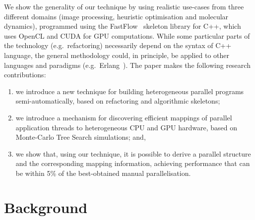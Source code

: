\documentclass[smallextended]{svjour3}
\begin{document}
We show the generality of our technique by using realistic 
use-cases from three different domains (image processing, 
heuristic optimisation and molecular dynamics), %
programmed using the FastFlow~\cite{AldinucciDKMT11} skeleton library for C++, which uses OpenCL and CUDA for GPU computations. While some particular parts of the technology (e.g.~refactoring) necessarily depend on the syntax of C++ language, the general methodology could, in principle, be applied to other languages and paradigms (e.g.~Erlang~\cite{lapedo}).
%
The paper makes the following research contributions:
\begin{enumerate}
\item we introduce a new technique for building
  heterogeneous parallel programs semi-automatically, based on refactoring and algorithmic skeletons;
\item we introduce a mechanism for discovering
  efficient mappings of parallel application threads to heterogeneous CPU
  and GPU hardware, based on Monte-Carlo Tree Search simulations; and,
\item we
  show that, using our technique, 
  it is possible to derive a parallel structure and the corresponding mapping information, achieving
  performance that can be within 5\% of the best-obtained manual parallelisation.
\end{enumerate}

\section{Background} \label{sec:background}
\end{document}
